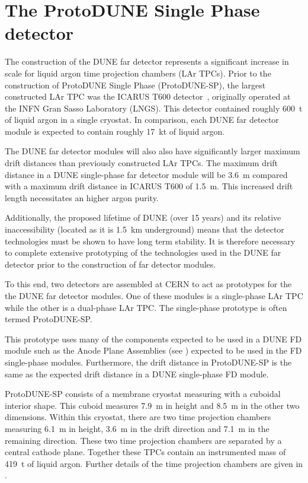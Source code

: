 \chapter{The ProtoDUNE Single Phase detector}
\label{sec:protodune}

The construction of the DUNE far detector represents a significant increase in scale for liquid argon time projection chambers (LAr TPCs).
Prior to the construction of ProtoDUNE Single Phase (ProtoDUNE-SP), the largest constructed LAr TPC was the ICARUS T600 detector~\cite{icarus}, originally operated at the INFN Gran Sasso Laboratory (LNGS).
This detector contained roughly \SI{600}{\tonne} of liquid argon in a single cryostat.
In comparison, each DUNE far detector module is expected to contain roughly \SI{17}{\kilo\tonne} of liquid argon.

The DUNE far detector modules will also also have significantly larger maximum drift distances than previously constructed LAr TPCs.
The maximum drift distance in a DUNE single-phase far detector module will be \SI{3.6}{\m} compared with a maximum drift distance in ICARUS T600 of \SI{1.5}{\m}.
This increased drift length necessitates an higher argon purity.

Additionally, the proposed lifetime of DUNE (over 15 years) and its relative inaccessibility (located as it is \SI{1.5}{\kilo\metre} underground) means that the detector technologies must be shown to have long term stability.
It is therefore necessary to complete extensive prototyping of the technologies used in the DUNE far detector prior to the construction of far detector modules.

To this end, two detectors are assembled at CERN to act as prototypes for the the DUNE far detector modules.
One of these modules is a single-phase LAr TPC while the other is a dual-phase LAr TPC.
The single-phase prototype is often termed ProtoDUNE-SP.

This prototype uses many of the components expected to be used in a DUNE FD module such as the Anode Plane Assemblies (see ) expected to be used in the FD single-phase modules.
Furthermore, the drift distance in ProtoDUNE-SP is the same as the expected drift distance in a DUNE single-phase FD module.

ProtoDUNE-SP consists of a membrane cryostat measuring with a cuboidal interior shape.
This cuboid measures \SI{7.9}{\m} in height and \SI{8.5}{\m} in the other two dimensions.
Within this cryostat, there are two time projection chambers measuring \SI{6.1}{\m} in height, \SI{3.6}{\m} in the drift direction and \SI{7.1}{\m} in the remaining direction.
These two time projection chambers are separated by a central cathode plane.
Together these TPCs contain an instrumented mass of \SI{419}{\tonne} of liquid argon.
Further details of the time projection chambers are given in .

